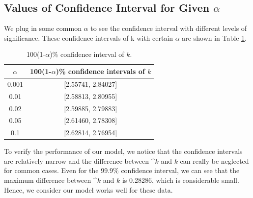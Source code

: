 \documentclass[a4paper]{article}
\begin{document}
{{\subsection{Values of Confidence Interval for Given $\alpha$}
\par{We plug in some common $\alpha$ to see the confidence interval with different levels of significance. These confidence intervals of k with certain $\alpha$ are shown in Table \ref{cfi}}.
\begin{table}[h]
\centering
    \begin{tabular}{c|c}
         \hline
$\alpha$& 100(1-$\alpha$)\% confidence intervals of $k$\\
\hline
\hline
        0.001&[2.55741, 2.84027]\\
          0.01&[2.58813, 2.80955]\\

         0.02&[2.59885, 2.79883]\\

         0.05&[2.61460, 2.78308]\\
 
         0.1&[2.62814, 2.76954]\\
         \hline
    \end{tabular}
\caption{100(1-$\alpha$)\% confidence interval of $k$.}
\label{cfi}
\end{table}
\par{To verify the performance of our model, we notice that the confidence intervals are relatively narrow and the difference between $\^{k}$ and $k$ can really be neglected for common cases. Even for the 99.9\% confidence interval, we can see that the maximum difference between $\^{k}$ and $k$ is 0.28286, which is considerable small. Hence, we consider our model works well for these data.}
\newpage

}}
\end{document}
